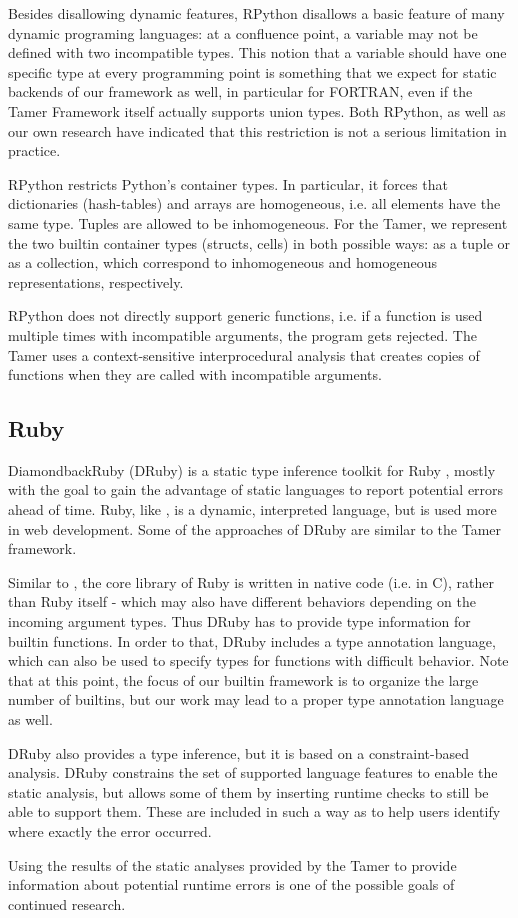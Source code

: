 
Besides disallowing dynamic features, RPython disallows a basic feature
of many dynamic programing languages: at a confluence point,
a variable may not be defined with two incompatible types. This
notion that a variable should have one specific type at every programming
point is something that we expect for static backends of our framework
as well, in particular for FORTRAN, even if the Tamer Framework itself
actually supports union types. Both RPython, as well as our own research
have indicated that this restriction is not a serious limitation in practice.

RPython restricts Python's container types. In particular, it forces
that dictionaries (hash-tables) and arrays are homogeneous, i.e. all
elements have the same type. Tuples are allowed to be inhomogeneous.
For the Tamer, we represent the two builtin container types (structs,
cells) in both possible ways: as a tuple or as a collection, which correspond to
inhomogeneous and homogeneous representations, respectively.

RPython does not directly support generic functions, i.e. if a function
is used multiple times with incompatible arguments, the program
gets rejected. The Tamer uses a context-sensitive interprocedural
analysis that creates copies of functions when they are called
with incompatible arguments.


\subsection{Ruby}
DiamondbackRuby (DRuby) is a static type inference toolkit for Ruby
\cite{StaticRuby}, mostly with the goal to gain the advantage of static languages
to report potential errors ahead of time.  Ruby, like \matlab, is a
dynamic, interpreted language, but is used more in web
development. Some of the approaches of DRuby are similar to the Tamer
framework.

Similar to \matlab, the core library of Ruby is written in native code
(i.e. in C), rather than Ruby itself - which may also have different
behaviors depending on the incoming argument types. Thus DRuby has to
provide type information for builtin functions. In order to that,
DRuby includes a type annotation language, which can also be used to
specify types for functions with difficult behavior. Note that at this
point, the focus of our builtin framework is to organize the large
number of builtins, but our work may lead to a proper type annotation
language as well.

DRuby also provides a type inference, but it is based on a
constraint-based analysis. DRuby constrains the set of supported
language features to enable the static analysis, but allows some of
them by inserting runtime checks to still be able to support them.
These are included in such a way as to help users identify where
exactly the error occurred.

Using the results of the static analyses provided by the \matlab Tamer
to provide information about potential runtime errors is one
of the possible goals of continued research.
